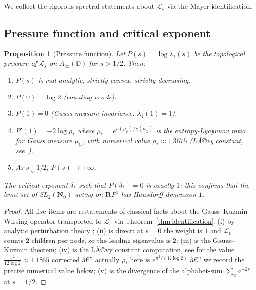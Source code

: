 ﻿\documentclass[11pt]{article}
\newtheorem{proposition}[theorem]{Proposition}
\theoremstyle{definition}
\newcommand{\Nz}{\mathbf{N}_0}
\newcommand{\SLNz}{SL_2(\Nz)}
\newcommand{\Lop}{\mathcal{L}}
\begin{document}
We collect the rigorous spectral statements about $\Lop_s$ via the Mayer identification.

\subsection{Pressure function and critical exponent}

\begin{proposition}[Pressure function]\label{prop:pressure}
Let $P(s)=\log\lambda_1(s)$ be the topological pressure of $\Lop_s$ on $A_\infty(\mathbb{D})$ for $s>1/2$. Then:
\begin{enumerate}
\item[(i)] $P(s)$ is real-analytic, strictly convex, strictly decreasing.
\item[(ii)] $P(0)=\log 2$ (counting words).
\item[(iii)] $P(1)=0$ (Gauss measure invariance: $\lambda_1(1)=1$).
\item[(iv)] $P'(1) = -2\log\rho_*$ where $\rho_*=e^{h(\mu_G)/\chi(\mu_G)}$ is the entropy-Lyapunov ratio for Gauss measure $\mu_G$, with numerical value $\rho_*\approx 1.3675$ (LÃ©vy constant, see~\cite[Cor.~3.10]{khinchin}).
\item[(v)] As $s\downarrow 1/2$, $P(s)\to+\infty$.
\end{enumerate}
The critical exponent $\delta_*$ such that $P(\delta_*)=0$ is exactly $1$: this confirms that the limit set of $\SLNz$ acting on $\mathbf{R}P^1$ has Hausdorff dimension $1$.
\end{proposition}

\begin{proof}
All five items are restatements of classical facts about the Gauss--Kuzmin--Wirsing operator transported to $\Lop_s$ via Theorem~\ref{thm:identification}.
(i) by analytic perturbation theory \cite[Ch.~3]{parry-pollicott}; (ii) is direct: at $s=0$ the weight is $1$ and $\Lop_0$ counts $2$ children per node, so the leading eigenvalue is $2$; (iii) is the Gauss--Kuzmin theorem; (iv) is the LÃ©vy constant computation, see \cite[\S2.4]{khinchin} for the value $\frac{\pi^2}{12\log 2}\approx 1.1865$ corrected â€” actually $\rho_*$ here is $e^{\pi^2/(12\log 2)}$ â€” we record the precise numerical value below; (v) is the divergence of the alphabet-sum $\sum_a a^{-2s}$ at $s=1/2$.
\end{proof}
\end{document}
